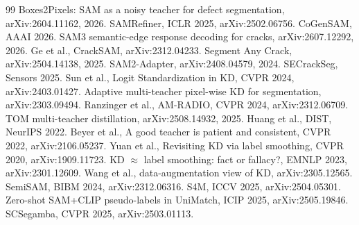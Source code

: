 \documentclass[11pt,a4paper]{article}
\begin{document}
\begin{thebibliography}{99}\small
{} Boxes2Pixels: SAM as a noisy teacher for defect segmentation, arXiv:2604.11162, 2026.
 SAMRefiner, ICLR 2025, arXiv:2502.06756.
 CoGenSAM, AAAI 2026.
 SAM3 semantic-edge response decoding for cracks, arXiv:2607.12292, 2026.
 Ge et al., CrackSAM, arXiv:2312.04233.
 Segment Any Crack, arXiv:2504.14138, 2025.
 SAM2-Adapter, arXiv:2408.04579, 2024.
 SECrackSeg, Sensors 2025.
 Sun et al., Logit Standardization in KD, CVPR 2024, arXiv:2403.01427.
 Adaptive multi-teacher pixel-wise KD for segmentation, arXiv:2303.09494.
 Ranzinger et al., AM-RADIO, CVPR 2024, arXiv:2312.06709.
 TOM multi-teacher distillation, arXiv:2508.14932, 2025.
 Huang et al., DIST, NeurIPS 2022.
 Beyer et al., A good teacher is patient and consistent, CVPR 2022, arXiv:2106.05237.
 Yuan et al., Revisiting KD via label smoothing, CVPR 2020, arXiv:1909.11723.
 KD $\approx$ label smoothing: fact or fallacy?, EMNLP 2023, arXiv:2301.12609.
 Wang et al., data-augmentation view of KD, arXiv:2305.12565.
 SemiSAM, BIBM 2024, arXiv:2312.06316.
 S4M, ICCV 2025, arXiv:2504.05301.
 Zero-shot SAM+CLIP pseudo-labels in UniMatch, ICIP 2025, arXiv:2505.19846.
 SCSegamba, CVPR 2025, arXiv:2503.01113.
\end{thebibliography}
\end{document}
